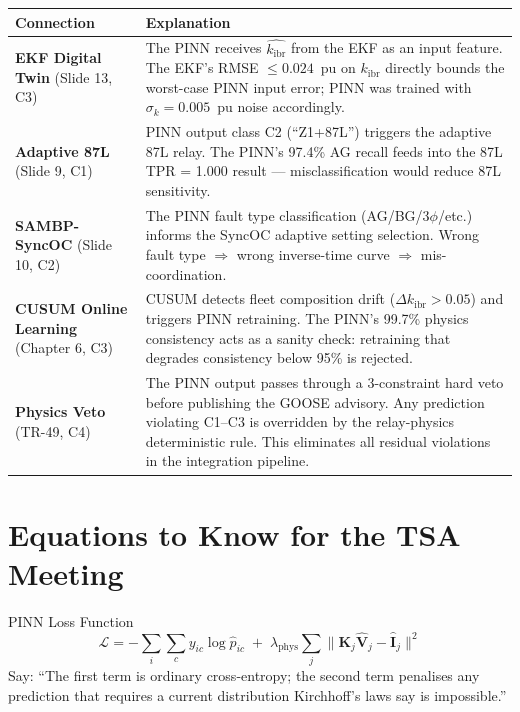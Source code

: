 \documentclass[12pt,a4paper]{article}
\newcommand{\kibr}{k_\mathrm{ibr}}
\begin{document}
\begin{center}
\begin{tabular}{@{}p{4cm}p{10.5cm}@{}}
\toprule
\textbf{Connection} & \textbf{Explanation} \\
\midrule
\textbf{EKF Digital Twin} \newline (Slide 13, C3) &
The PINN receives $\hat{\kibr}$ from the EKF as an input feature. The EKF's RMSE $\leq 0.024$~pu on $\kibr$ directly bounds the worst-case PINN input error; PINN was trained with $\sigma_k = 0.005$~pu noise accordingly. \\
\addlinespace
\textbf{Adaptive 87L} \newline (Slide 9, C1) &
PINN output class C2 (``Z1+87L'') triggers the adaptive 87L relay. The PINN's 97.4\% AG recall feeds into the 87L TPR = 1.000 result — misclassification would reduce 87L sensitivity. \\
\addlinespace
\textbf{SAMBP-SyncOC} \newline (Slide 10, C2) &
The PINN fault type classification (AG/BG/3$\phi$/etc.) informs the SyncOC adaptive setting selection. Wrong fault type $\Rightarrow$ wrong inverse-time curve $\Rightarrow$ mis-coordination. \\
\addlinespace
\textbf{CUSUM Online Learning} \newline (Chapter 6, C3) &
CUSUM detects fleet composition drift ($\Delta \kibr > 0.05$) and triggers PINN retraining. The PINN's 99.7\% physics consistency acts as a sanity check: retraining that degrades consistency below 95\% is rejected. \\
\addlinespace
\textbf{Physics Veto} \newline (TR-49, C4) &
The PINN output passes through a 3-constraint hard veto before publishing the GOOSE advisory. Any prediction violating C1--C3 is overridden by the relay-physics deterministic rule. This eliminates all residual violations in the integration pipeline. \\
\bottomrule
\end{tabular}
\end{center}

\section{Equations to Know for the TSA Meeting}

\begin{formulabox}{PINN Loss Function}
\[
  \mathcal{L} = -\sum_{i}\sum_{c} y_{ic}\log \hat{p}_{ic}
  \;+\; \lambda_\mathrm{phys}\sum_{j} \bigl\|\mathbf{K}_j\hat{\mathbf{V}}_j - \hat{\mathbf{I}}_j\bigr\|^2
\]
Say: ``The first term is ordinary cross-entropy; the second term penalises any prediction that requires a current distribution Kirchhoff's laws say is impossible.''
\end{formulabox}
\end{document}
